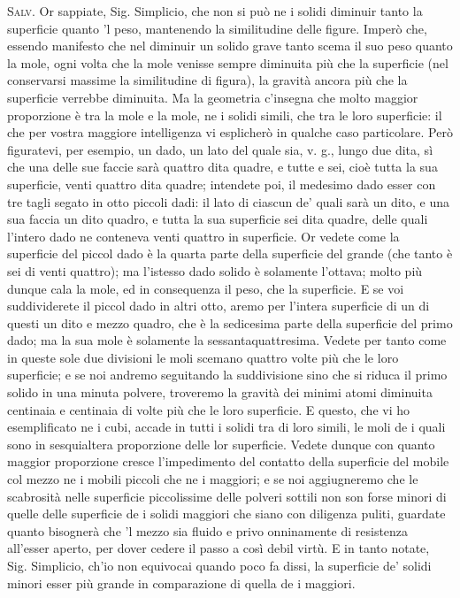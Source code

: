 \documentclass[11pt,twoside,openany]{book}
\newcommand{\speaker}[1]{\textcolor{rubric}{\textsc{#1}}\space}
\begin{document}
\speaker{Salv.} Or sappiate, Sig. Simplicio, che non si può ne i solidi diminuir tanto la superficie quanto 'l peso, mantenendo la similitudine delle figure. Imperò che, essendo manifesto che nel diminuir un solido grave tanto scema il suo peso quanto la mole, ogni volta che la mole venisse sempre diminuita più che la superficie (nel conservarsi massime la similitudine di figura), la gravità ancora più che la superficie verrebbe diminuita. Ma la geometria c'insegna che molto maggior proporzione è tra la mole e la mole, ne i solidi simili, che tra le loro superficie: il che per vostra maggiore intelligenza vi esplicherò in qualche caso particolare. Però figuratevi, per esempio, un dado, un lato del quale sia, v. g., lungo due dita, sì che una delle sue faccie sarà quattro dita quadre, e tutte e sei, cioè tutta la sua superficie, venti quattro dita quadre; intendete poi, il medesimo dado esser con tre tagli segato in otto piccoli dadi: il lato di ciascun de' quali sarà un dito, e una sua faccia un dito quadro, e tutta la sua superficie sei dita quadre, delle quali l'intero dado ne conteneva venti quattro in superficie. Or vedete come la superficie del piccol dado è la quarta parte della superficie del grande (che tanto è sei di venti quattro); ma l'istesso dado solido è solamente l'ottava; molto più dunque cala la mole, ed in consequenza il peso, che la superficie. E se voi suddividerete il piccol dado in altri otto, aremo per l'intera superficie di un di questi un dito e mezzo quadro, che è la sedicesima parte della superficie del primo dado; ma la sua mole è solamente la sessantaquattresima. Vedete per tanto come in queste sole due divisioni le moli scemano quattro volte più che le loro superficie; e se noi andremo seguitando la suddivisione sino che si riduca il primo solido in una minuta polvere, troveremo la gravità dei minimi atomi diminuita centinaia e centinaia di volte più che le loro superficie. E questo, che vi ho esemplificato ne i cubi, accade in tutti i solidi tra di loro simili, le moli de i quali sono in sesquialtera proporzione delle lor superficie. Vedete dunque con quanto maggior proporzione cresce l'impedimento del contatto della superficie del mobile col mezzo ne i mobili piccoli che ne i maggiori; e se noi aggiugneremo che le scabrosità nelle superficie piccolissime delle polveri sottili non son forse minori di quelle delle superficie de i solidi maggiori che siano con diligenza puliti, guardate quanto bisognerà che 'l mezzo sia fluido e privo onninamente di resistenza all'esser aperto, per dover cedere il passo a così debil virtù. E in tanto notate, Sig. Simplicio, ch'io non equivocai quando poco fa dissi, la superficie de' solidi minori esser più grande in comparazione di quella de i maggiori.
\end{document}
